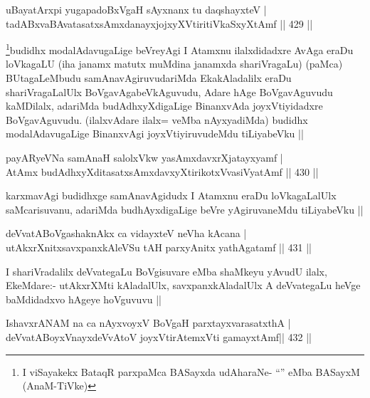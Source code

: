 \begin{shl}
uBayatArxpi yugapadoBxVgaH sAyxnanx tu daqshayxteV | \\
tadABxvaBAvatasatxsAmxdanayxjojxyXVtiritiVkaSxyXtAmf \hfill||  429 ||  
\end{shl}

\begin{artha}
\footnote{I viSayakekx BataqR parxpaMca BASayxda udAharaNe- ``\stext'' eMba BASayxM (AnaM-TiVke)}budidhx modalAdavugaLige beVreyAgi I Atamxnu ilalxdidadxre AvAga eraDu loVkagaLU (iha janamx matutx muMdina janamxda shariVragaLu) (paMca) BUtagaLeMbudu samAnavAgiruvudariMda EkakAladalilx eraDu shariVragaLalUlx BoVgavAgabeVkAguvudu, Adare hAge BoVgavAguvudu kaMDilalx, adariMda budAdhxyXdigaLige BinanxvAda joyxVtiyidadxre BoVgavAguvudu. (ilalxvAdare ilalx= veMba nAyxyadiMda) budidhx modalAdavugaLige BinanxvAgi joyxVtiyiruvudeMdu tiLiyabeVku ||
\end{artha}

\begin{shl}
payARyeVNa samAnaH salolxVkw yasAmxdavxrXjatayxyamf | \\
AtAmx budAdhxyXditasatxsAmxdavxyXtirikotxV\s vasiVyatAmf \hfill||  430 || 
\end{shl}

\begin{artha}
karxmavAgi budidhxge samAnavAgidudx I Atamxnu eraDu loVkagaLalUlx saMcarisuvanu, adariMda budhAyxdigaLige beVre yAgiruvaneMdu tiLiyabeVku ||
\end{artha}


\begin{shl}
deVvatABoVgashaknAkx ca vidayxteV neVha kAcana | \\
utAkxrXnitxsavxpanxkAleVSu tAH parxyAnitx yathAgatamf \hfill||  431 ||  
\end{shl}

\begin{artha}
I shariVradalilx deVvategaLu BoVgisuvare eMba shaMkeyu yAvudU ilalx, EkeMdare:- utAkxrXMti kAladalUlx, savxpanxkAladalUlx A deVvategaLu heVge baMdidadxvo hAgeye hoVguvuvu ||
\end{artha}


\begin{shl}
IshavxrANAM na ca nAyxvoyxV BoVgaH parxtayxvarasatxthA | \\
deVvatABoyxV\s nayxdeVvAtoV joyxVtirAtemxVti gamayxtAmf\hfill ||  432 ||  
\end{shl}

